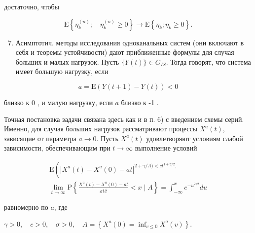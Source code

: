 \documentclass[10pt]{article}
\begin{document}
достаточно, чтобы



\[

\mathrm{E}\left\{\eta_{k}^{(n)} ; \quad \eta_{k}^{(n)} \geqslant 0\right\} \rightarrow \mathrm{E}\left\{\eta_{k} ; \eta_{k} \geqslant 0\right\} .

\]



\begin{enumerate}

  \setcounter{enumi}{6}

  \item Асимптотич. методы исследования одноканальных систем (они включают в себя и теоремы устойчивости) дают приближенные формулы для случая больших и малых нагрузок. Пусть $\{Y(t)\} \in G_{I S}$. Тогда говорят, что система имеет большую нагрузку, если

\end{enumerate}



\[

a=\mathrm{E}(Y(t+1)-Y(t))<0

\]



близко к 0 , и малую нагрузку, если $a$ близко к -1 .



Точная постановка задачи связана здесь как и в п. 6) с введением схемы серий. Именно, для случая больших нагрузок рассматривают процессы $X^{a}(t)$, зависящие от параметра $a \rightarrow 0$. Пусть $X^{a}(t)$ удовлетворяют условиям слабой зависимости, обеспечивающим при $t \rightarrow \infty$ выполнение условий



\[

\begin{gathered}

\mathrm{E}\left(\left|X^{a}(t)-X^{a}(0)-a t\right|^{2+\gamma / A)<c t^{1+\gamma / 2},}\right. \\

\lim _{t \rightarrow \infty} \mathrm{P}\left\{\frac{X^{a}(t)-X^{a}(0)-a t}{\sigma V \bar{t}}<x \mid A\right\}=\int_{-\infty}^{x} e^{-u^{2 / 2}} d u

\end{gathered}

\]



равномерно по $a$, где



$\gamma>0, \quad c>0, \quad \sigma>0, \quad A=\left\{X^{a}(0)=\inf _{v \leqslant 0} X^{a}(v)\right\}$.
\end{document}

